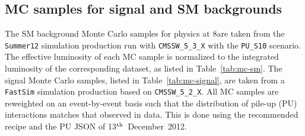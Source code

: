 \subsection{MC samples for signal and SM backgrounds\label{sec:mc-samples}}

The SM background Monte Carlo samples for physics at 8\TeV are taken
from the \verb!Summer12! simulation production run with
\verb!CMSSW_5_3_X! with the \verb!PU_S10! scenario. The effective
luminosity of each MC sample is normalized to the integrated
luminosity of the corresponding dataset, as listed in
Table~\ref{tab:mc-sm}. 
The signal \MADGRAPH Monte Carlo samples, listed in
Table~\ref{tab:mc-signal}, are taken from a \verb!FastSim! simulation
production based on \verb!CMSSW_5_2_X!. 
All MC samples are reweighted on an event-by-event basis such that the
distribution of pile-up (PU) interactions matches that observed in
data. This is done using the recommended recipe and the PU JSON of
13$^{\rm th}$~December~2012.
%
